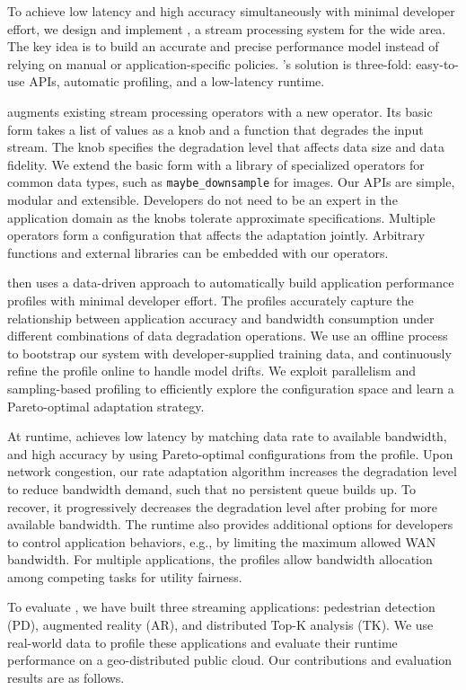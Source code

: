 To achieve low latency and high accuracy simultaneously with minimal developer
effort, we design and implement \sysname{}, a stream processing system for the
wide area. The key idea is to build an accurate and precise performance model
instead of relying on manual or application-specific policies. \sysname{}'s
solution is three-fold: easy-to-use APIs, automatic profiling, and a low-latency
runtime.

\sysname{} augments existing stream processing operators with a new \maybe{}
operator. Its basic form takes a list of values as a knob and a function that
degrades the input stream. The knob specifies the degradation level that affects
data size and data fidelity. We extend the basic form with a library of
specialized operators for common data types, such as \texttt{maybe\_downsample}
for images. Our APIs are simple, modular and extensible. Developers do not need
to be an expert in the application domain as the knobs tolerate approximate
specifications. Multiple operators form a configuration that affects the
adaptation jointly. Arbitrary functions and external libraries can be embedded
with our operators.

\sysname{} then uses a data-driven approach to automatically build application
performance profiles with minimal developer effort. The profiles accurately
capture the relationship between application accuracy and bandwidth consumption
under different combinations of data degradation operations. We use an offline
process to bootstrap our system with developer-supplied training data, and
continuously refine the profile online to handle model drifts. We exploit
parallelism and sampling-based profiling to efficiently explore the
configuration space and learn a Pareto-optimal adaptation strategy.

At runtime, \sysname{} achieves low latency by matching data rate to available
bandwidth, and high accuracy by using Pareto-optimal configurations from the
profile. Upon network congestion, our rate adaptation algorithm increases the
degradation level to reduce bandwidth demand, such that no persistent queue
builds up. To recover, it progressively decreases the degradation level after
probing for more available bandwidth. The runtime also provides additional
options for developers to control application behaviors, e.g., by limiting the
maximum allowed WAN bandwidth. For multiple applications, the
profiles allow bandwidth allocation among competing tasks for utility fairness.

To evaluate \sysname{}, we have built three streaming applications: pedestrian
detection (PD), augmented reality (AR), and distributed Top-K analysis (TK). We
use real-world data to profile these applications and evaluate their runtime
performance on a geo-distributed public cloud. Our contributions and evaluation
results are as follows.

